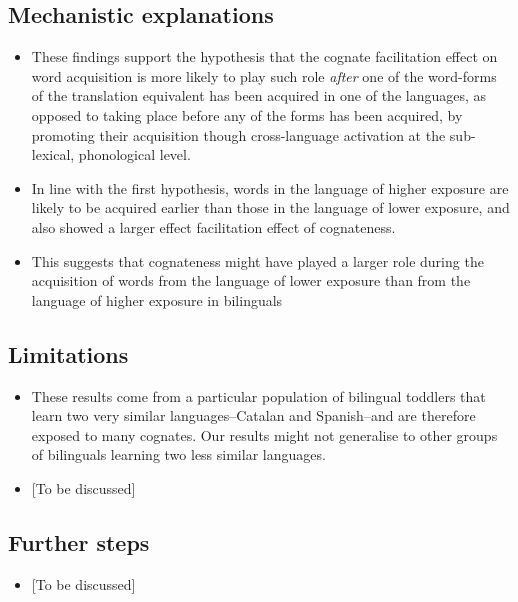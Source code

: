 \documentclass[
  letterpaper,
  DIV=11,
  numbers=noendperiod]{scrartcl}
\providecommand{\tightlist}{%
  \setlength{\itemsep}{0pt}\setlength{\parskip}{0pt}}\usepackage{longtable,booktabs,array}
\begin{document}
\hypertarget{mechanistic-explanations}{%
\subsection{Mechanistic explanations}\label{mechanistic-explanations}}

\begin{itemize}
\tightlist
\item
  These findings support the hypothesis that the cognate facilitation
  effect on word acquisition is more likely to play such role
  \emph{after} one of the word-forms of the translation equivalent has
  been acquired in one of the languages, as opposed to taking place
  before any of the forms has been acquired, by promoting their
  acquisition though cross-language activation at the sub-lexical,
  phonological level.
\item
  In line with the first hypothesis, words in the language of higher
  exposure are likely to be acquired earlier than those in the language
  of lower exposure, and also showed a larger effect facilitation effect
  of cognateness.
\item
  This suggests that cognateness might have played a larger role during
  the acquisition of words from the language of lower exposure than from
  the language of higher exposure in bilinguals
\end{itemize}

\hypertarget{limitations}{%
\subsection{Limitations}\label{limitations}}

\begin{itemize}
\tightlist
\item
  These results come from a particular population of bilingual toddlers
  that learn two very similar languages--Catalan and Spanish--and are
  therefore exposed to many cognates. Our results might not generalise
  to other groups of bilinguals learning two less similar languages.
\item
  {[}To be discussed{]}
\end{itemize}

\hypertarget{further-steps}{%
\subsection{Further steps}\label{further-steps}}

\begin{itemize}
\tightlist
\item
  {[}To be discussed{]}
\end{itemize}
\end{document}
